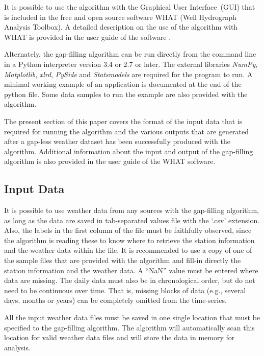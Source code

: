 \documentclass[TechnicalNoteMeteo.tex]{subfiles}
\begin{document}
It is possible to use the algorithm with the Graphical User Interface~(GUI) that is included in the free and open source software WHAT (Well Hydrograph Analysis Toolbox). A detailed description on the use of the algorithm with WHAT is provided in the user guide of the software \citep{gosselin_what_2015}.

Alternately, the gap-filling algorithm can be run directly from the command line in a Python interpreter version 3.4 or 2.7 or later. The external libraries \emph{NumPy}, \emph{Matplotlib}, \emph{xlrd}, \emph{PySide} and \emph{Statsmodels} are required for the program to run. A minimal working example of an application is documented at the end of the python file. Some data samples to run the example are also provided with the algorithm.

The present section of this paper covers the format of the input data that is required for running the algorithm and the various outputs that are generated after a gap-less weather dataset has been successfully produced with the algorithm. Additional information about the input and output of the gap-filling algorithm is also provided in the user guide of the WHAT software.

\subsection{Input Data}\label{subsec:input}

It is possible to use weather data from any sources with the gap-filling algorithm, as long as the data are saved in tab-separated values file with the `.csv' extension. Also, the labels in the first column of the file must be faithfully observed, since the algorithm is reading these to know where to retrieve the station information and the weather data within the file. It is recommended to use a copy of one of the sample files that are provided with the algorithm and fill-in directly the station information and the weather data. A ``NaN'' value must be entered where data are missing. The daily data must also be in chronological order, but do not need to be continuous over time. That is, missing blocks of data (e.g., several days, months or years) can be completely omitted from the time-series. 

All the input weather data files must be saved in one single location that must be specified to the gap-filling algorithm. The algorithm will automatically scan this location for valid weather data files and will store the data in memory for analysis.
\end{document}
